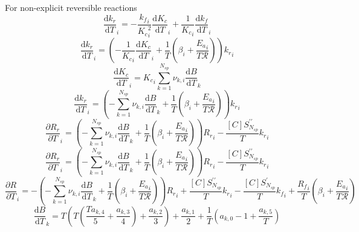 \documentclass[a4paper,10pt]{article}
\newcommand{\ns}{N_{sp}}
\newcommand{\Ru}{\mathcal{R}}
\begin{document}
For non-explicit reversible reactions
\begin{dmath} \frac{\text{d} {k_r} }{\text{d} T }_{i} = - \frac{{k_f}_{i}}{{K_c}_{i}^{2}} \frac{\text{d} {K_c} }{\text{d} T }_{i} + \frac{1}{{K_c}_{i}} \frac{\text{d} {k_f} }{\text{d} T }_{i}\end{dmath} 
\begin{dmath} \frac{\text{d} {k_r} }{\text{d} T }_{i} = \left(- \frac{1}{{K_c}_{i}} \frac{\text{d} {K_c} }{\text{d} T }_{i} + \frac{1}{T} \left(\beta_{i} + \frac{{E_{a}}_{i}}{T \Ru}\right)\right) {k_r}_{i}\end{dmath} 
\begin{dmath} \frac{\text{d} {K_c} }{\text{d} T }_{i} = {K_c}_{i} \sum_{k=1}^{\ns} \nu_{k,i} \frac{\text{d} B }{\text{d} T }_{k}\end{dmath} 
\begin{dmath} \frac{\text{d} {k_r} }{\text{d} T }_{i} = \left(- \sum_{k=1}^{\ns} \nu_{k,i} \frac{\text{d} B }{\text{d} T }_{k} + \frac{1}{T} \left(\beta_{i} + \frac{{E_{a}}_{i}}{T \Ru}\right)\right) {k_r}_{i}\end{dmath} 
\begin{dmath} \frac{\partial {R_r} }{\partial T }_{i} = \left(- \sum_{k=1}^{\ns} \nu_{k,i} \frac{\text{d} B }{\text{d} T }_{k} + \frac{1}{T} \left(\beta_{i} + \frac{{E_{a}}_{i}}{T \Ru}\right)\right) {R_r}_{i} - \frac{[C] S^{\prime\prime}_{\ns}}{T} {k_r}_{i}\end{dmath} 
\begin{dmath} \frac{\partial {R_r} }{\partial T }_{i} = \left(- \sum_{k=1}^{\ns} \nu_{k,i} \frac{\text{d} B }{\text{d} T }_{k} + \frac{1}{T} \left(\beta_{i} + \frac{{E_{a}}_{i}}{T \Ru}\right)\right) {R_r}_{i} - \frac{[C] S^{\prime\prime}_{\ns}}{T} {k_r}_{i}\end{dmath} 
\begin{dmath} \frac{\partial R }{\partial T }_{i} = - \left(- \sum_{k=1}^{\ns} \nu_{k,i} \frac{\text{d} B }{\text{d} T }_{k} + \frac{1}{T} \left(\beta_{i} + \frac{{E_{a}}_{i}}{T \Ru}\right)\right) {R_r}_{i} + \frac{[C] S^{\prime\prime}_{\ns}}{T} {k_r}_{i} - \frac{[C] S^{\prime}_{\ns}}{T} {k_f}_{i} + \frac{{R_f}_{i}}{T} \left(\beta_{i} + \frac{{E_{a}}_{i}}{T \Ru}\right)\end{dmath} 
\begin{dmath} \frac{\text{d} B }{\text{d} T }_{k} = T \left(T \left(\frac{T a_{k,4}}{5} + \frac{a_{k,3}}{4}\right) + \frac{a_{k,2}}{3}\right) + \frac{a_{k,1}}{2} + \frac{1}{T} \left(a_{k,0} - 1 + \frac{a_{k,5}}{T}\right)\end{dmath} 
\end{document}
